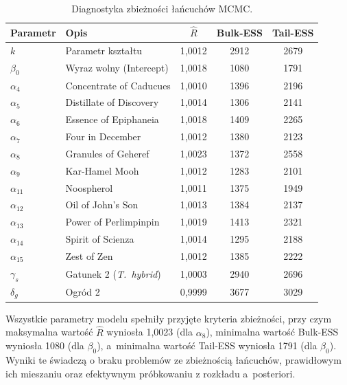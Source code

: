 \documentclass[12pt, a4paper]{article}
\begin{document}
\begin{table}[h!]
\centering
\caption{Diagnostyka zbieżności łańcuchów MCMC.}
\label{tab:diagnostics}
\begin{tabular}{llccc}
\toprule
\textbf{Parametr} & \textbf{Opis} & \textbf{$\hat{R}$} & \textbf{Bulk-ESS} & \textbf{Tail-ESS} \\
\midrule
$k$             & Parametr kształtu           & 1,0012 & 2912 & 2679 \\
$\beta_0$       & Wyraz wolny (Intercept)      & 1,0018 & 1080 & 1791 \\
$\alpha_4$      & Concentrate of Caducues      & 1,0010 & 1396 & 2196 \\
$\alpha_5$      & Distillate of Discovery      & 1,0014 & 1306 & 2141 \\
$\alpha_6$      & Essence of Epiphaneia        & 1,0018 & 1409 & 2265 \\
$\alpha_7$      & Four in December             & 1,0012 & 1380 & 2123 \\
$\alpha_8$      & Granules of Geheref          & 1,0023 & 1372 & 2558 \\
$\alpha_9$      & Kar-Hamel Mooh               & 1,0012 & 1283 & 2101 \\
$\alpha_{11}$   & Noospherol                   & 1,0011 & 1375 & 1949 \\
$\alpha_{12}$   & Oil of John's Son            & 1,0013 & 1384 & 2137 \\
$\alpha_{13}$   & Power of Perlimpinpin        & 1,0019 & 1413 & 2321 \\
$\alpha_{14}$   & Spirit of Scienza            & 1,0014 & 1295 & 2188 \\
$\alpha_{15}$   & Zest of Zen                  & 1,0012 & 1385 & 2222 \\
$\gamma_s$      & Gatunek 2 (\textit{T.~hybrid}) & 1,0003 & 2940 & 2696 \\
$\delta_g$          & Ogród 2                  & 0,9999 & 3677 & 3029 \\
\bottomrule
\end{tabular}
\end{table}

Wszystkie parametry modelu spełniły przyjęte kryteria zbieżności, przy czym maksymalna wartość $\hat{R}$ wyniosła 1,0023 (dla $\alpha_8$), minimalna wartość Bulk-ESS wyniosła 1080 (dla $\beta_0$), a~minimalna wartość Tail-ESS wyniosła 1791 (dla $\beta_0$). Wyniki te świadczą o braku problemów ze zbieżnością łańcuchów, prawidłowym ich mieszaniu oraz efektywnym próbkowaniu z rozkładu a~posteriori.
\end{document}
